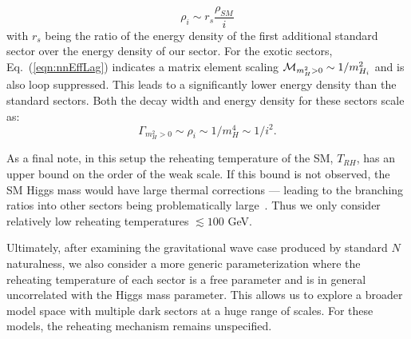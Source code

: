 \documentclass[nofootinbib,twocolumn,preprintnumbers]{revtex4-1}
\begin{document}
\begin{equation}\label{eqn:edSS}
\rho_i \sim r_{s}\frac{\rho_{SM}}{i}
\end{equation} 
with $r_s$ being the ratio of the energy density of the first additional standard sector over the energy density of our sector.
For the exotic sectors, Eq.~(\ref{eqn:nnEffLag}) indicates a matrix element scaling ${\cal M}_{m_H^2>0} \sim 1/m_{H_i}^2$ and is also loop suppressed. 
This leads to a significantly lower energy density than the standard sectors. Both the decay width and energy density for these sectors scale as: 
\begin{equation}
\Gamma_{m_H^2>0} \sim \rho_i \sim 1/m_H^4 \sim 1/i^2.
\label{eq:reheat_exotic}
\end{equation} 

As a final note, in this setup the reheating temperature of the SM, $T_{RH}$, has an upper bound on the order of the weak scale. If this bound is not observed, the SM Higgs mass would have large thermal corrections --- leading to the branching ratios into other sectors being problematically large~\citep{Arkani-Hamed:2016rle}. Thus we only consider relatively low reheating temperatures $\lesssim 100$ GeV.

Ultimately, after examining the gravitational wave case produced by standard $N$naturalness, we also consider a more generic parameterization where the reheating temperature of each sector is a free parameter and is in general uncorrelated with the Higgs mass parameter. This allows us to explore a broader model space with multiple dark sectors at a huge range of scales. For these models, the reheating mechanism remains unspecified.
\end{document}
